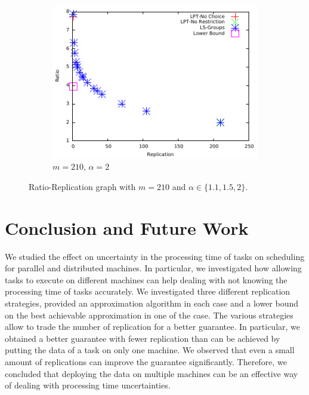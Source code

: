 \documentclass[10pt, conference, compsocconf]{IEEEtran}
\begin{document}
\begin {figure}
  \begin{subfigure}[b]{0.5\textwidth}
    \includegraphics[width=\textwidth]{alpha_2.pdf}
    \caption{$m=210$, $\alpha=2$}
    \label{fig:3}
  \end{subfigure} %

  \caption{Ratio-Replication graph with $m=210$ and $\alpha \in \{1.1, 1.5, 2\}$.}
  \label{fig:Graph}
\end{figure}

\section{Conclusion and Future Work}\label{sec8}

We studied the effect on uncertainty in the processing time of tasks
on scheduling for parallel and distributed machines. In particular, we
investigated how allowing tasks to execute on different machines can
help dealing with not knowing the processing time of tasks
accurately. We investigated three different replication strategies,
provided an approximation algorithm in each case and a lower bound on the
best achievable approximation in one of the case. The various
strategies allow to trade the number of replication for a better
guarantee. In particular, we obtained a better guarantee with fewer
replication than can be achieved by putting the data of a task on only
one machine. We observed that even a small amount of replications can
improve the guarantee significantly. Therefore, we concluded that
deploying the data on multiple machines can be an effective way of
dealing with processing time uncertainties.
\end{document}

